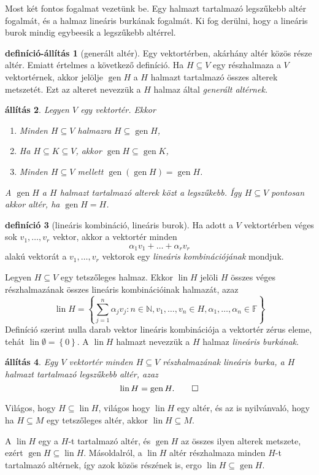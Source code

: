 \documentclass[9pt, a4paper, showtrims]{memoir}
\makeatletter
\renewenvironment{proof}[1][\proofname]
    {\par\pushQED{\qed}%
    \normalfont \topsep6\p@\@plus6\p@\relax
    \trivlist
    \item[\hskip\labelsep
        \itshape
    #1\@addpunct{:}]\ignorespaces}
    {\popQED\endtrivlist\@endpefalse}
\theoremstyle{plain}
\newtheorem{proposition}{állítás}[chapter]
\theoremstyle{remark}
\theoremstyle{definition}
\newtheorem{definition}[proposition]{definíció}
\newtheorem{defprop}[proposition]{definíció-állítás}
\DeclareMathOperator{\lin}{lin}
\DeclareMathOperator{\gen}{gen}
\makeatother
\begin{document}
Most két fontos fogalmat vezetünk be.
Egy halmazt tartalmazó legszűkebb altér fogalmát,
és a halmaz lineáris burkának fogalmát.
Ki fog derülni, hogy a lineáris burok mindig egybeesik a legszűkebb altérrel.
\begin{defprop}[generált altér]
	Egy vektortérben, akárhány altér közös része altér.
	Emiatt értelmes a következő definíció.
	Ha $H\subseteq V$ egy részhalmaza a $V$ vektortérnek,
	akkor jelölje
	$\gen H$ a $H$ halmazt tartalmazó összes alterek metszetét.
	Ezt az alteret nevezzük a $H$ halmaz által \emph{generált altérnek.}
\end{defprop}
\begin{proposition}
	Legyen $V$ egy vektortér.
	Ekkor
	\begin{enumerate}
		\item Minden $H\subseteq V$ halmazra $H\subseteq \gen H$,
		\item Ha $H\subseteq K\subseteq V$, akkor $\gen H\subseteq \gen K$,
		\item Minden $H\subseteq V$ mellett $\gen\left( \gen H \right)=\gen H$.
	\end{enumerate}
	A $\gen H$ a $H$ halmazt tartalmazó alterek közt a legszűkebb.
	Így $H\subseteq V$ pontosan akkor altér, ha $\gen H=H$.
\end{proposition}
\begin{definition}[lineáris kombináció, lineáris burok]
	Ha adott a $V$ vektortérben véges sok $v_1,\ldots,v_r$ vektor,
	akkor a vektortér minden
	\[
		\alpha_1v_1+\dots+\alpha_r v_r
	\]
	alakú vektorát a $v_1,\ldots,v_r$ vektorok egy \emph{lineáris kombinációjának} mondjuk.

	Legyen $H\subseteq V$ egy tetszőleges halmaz.
	Ekkor $\lin H$ jelöli $H$ összes véges részhalmazának összes lineáris kombinációinak halmazát,
	azaz
	\[
		\lin H=
		\left\{ \sum_{j=1}^n\alpha_jv_j:n\in\mathbb{N},v_1,\ldots,v_n\in H,\alpha_1,\ldots,\alpha_n\in\mathbb{F} \right\}
	\]
	Definíció szerint nulla darab vektor lineáris kombinációja a vektortér zérus eleme,
	tehát $\lin \emptyset=\left\{ 0 \right\}.$
	A $\lin H$ halmazt nevezzük a $H$ halmaz \emph{lineáris burkának}.
\end{definition}
\begin{proposition}
	Egy $V$ vektortér minden $H\subseteq V$ részhalmazának lineáris burka,
	a $H$ halmazt tartalmazó legszűkebb altér, azaz
	\[
		\lin H=\gen H.\qedhere
	\]
\end{proposition}
\begin{proof}
	Világos, hogy $H\subseteq \lin H$, világos hogy $\lin H$ egy altér,
	és az is nyilvánvaló, hogy ha $H\subseteq M$ egy tetszőleges altér,
	akkor $\lin H\subseteq M$.

	A $\lin H$ egy a $H$-t tartalmazó altér,
	és $\gen H$ az összes ilyen alterek metszete, ezért
	$\gen H\subseteq\lin H$.
	Másoldalról, a $\lin H$ altér részhalmaza minden $H$-t tartalmazó altérnek,
	így azok közös részének is,
	ergo
	$\lin H\subseteq \gen H$.
\end{proof}
\end{document}
